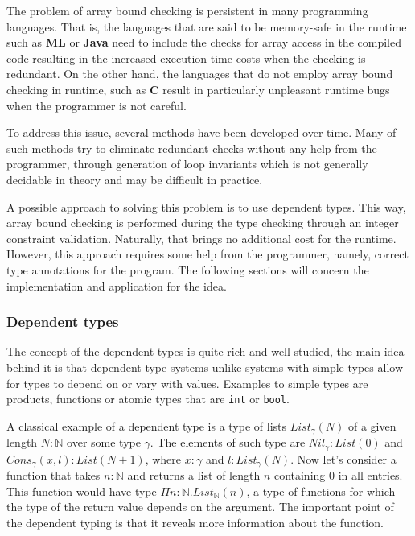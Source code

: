 \documentclass[a4paper,UKenglish]{lipics-v2016}
\begin{document}
The problem of array bound checking is persistent in many programming
languages. That is, the languages that are said to be memory-safe in the
runtime such as \textbf{ML} or \textbf{Java} need to include the checks for
array access in the compiled code resulting in the increased execution time
costs when the checking is redundant. On the other hand, the languages that do
not employ array bound checking in runtime, such as \textbf{C} result in
particularly unpleasant runtime bugs when the programmer is not careful.

To address this issue, several methods have been developed over time. Many of
such methods try to eliminate redundant checks without any help from the
programmer, through generation of loop invariants which is not generally
decidable in theory and may be difficult in practice.

A possible approach to solving this problem is to use dependent types. This
way, array bound checking is performed during the type checking through an
integer constraint validation. Naturally, that brings no additional cost for
the runtime.  However, this approach requires some help from the programmer,
namely, correct type annotations for the program. The following sections will
concern the implementation and application for the idea.

\subsubsection{Dependent types}

The concept of the dependent types is quite rich and well-studied, the main
idea behind it is that dependent type systems unlike systems with simple types
allow for types to depend on or vary with values. Examples to simple types are
products, functions or atomic types that are \texttt{int} or \texttt{bool}.

A classical example of a dependent type is a type of lists $List_\gamma(N)$ of
a given length $N : \mathbb{N}$ over some type $\gamma$. The elements of such
type are $Nil_\gamma : List(0)$ and $Cons_\gamma(x, l) : List(N+1)$, where $x :
\gamma$ and $l : List_\gamma(N)$. Now let's consider a function that takes $n :
\mathbb{N}$ and returns a list of length $n$ containing $0$ in all entries.
This function would have type $\Pi n : \mathbb{N}.List_\mathbb{N}(n)$, a type
of functions for which the type of the return value depends on the argument.
The important point of the dependent typing is that it reveals more information
about the function.
\end{document}
